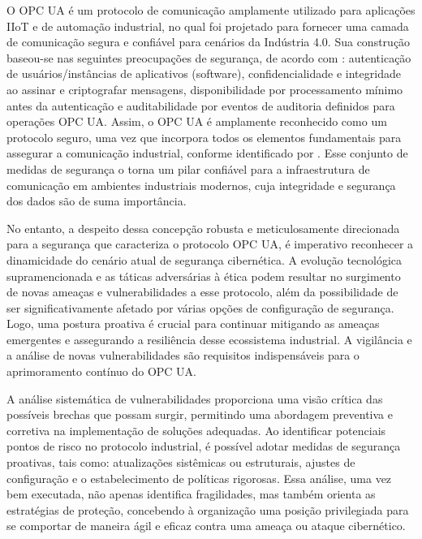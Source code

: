     O OPC UA é um protocolo de comunicação amplamente utilizado para aplicações IIoT e de automação industrial, no qual foi projetado para fornecer uma camada de comunicação segura e confiável para cenários da Indústria 4.0. Sua construção baseou-se nas seguintes preocupações de segurança, de acordo com : autenticação de usuários/instâncias de aplicativos (software), confidencialidade e integridade ao assinar e criptografar mensagens, disponibilidade por processamento mínimo antes da autenticação e auditabilidade por eventos de auditoria definidos para operações OPC UA. Assim, o OPC UA é amplamente reconhecido como um protocolo seguro, uma vez que incorpora todos os elementos fundamentais para assegurar a comunicação industrial, conforme identificado por  . Esse conjunto de medidas de segurança o torna um pilar confiável para a infraestrutura de comunicação em ambientes industriais modernos, cuja integridade e segurança dos dados são de suma importância.

    No entanto, a despeito dessa concepção robusta e meticulosamente direcionada para a segurança que caracteriza o protocolo OPC UA, é imperativo reconhecer a dinamicidade do cenário atual de segurança cibernética. A evolução tecnológica supramencionada e as táticas adversárias à ética podem resultar no surgimento de novas ameaças e vulnerabilidades a esse protocolo, além da possibilidade de ser significativamente afetado por várias opções de configuração de segurança. Logo, uma postura proativa é crucial para continuar mitigando as ameaças emergentes e assegurando a resiliência desse ecossistema industrial. A vigilância e a análise de novas vulnerabilidades são requisitos indispensáveis para o aprimoramento contínuo do OPC UA.

    A análise sistemática de vulnerabilidades proporciona uma visão crítica das possíveis brechas que possam surgir, permitindo uma abordagem preventiva e corretiva na implementação de soluções adequadas. Ao identificar potenciais pontos de risco no protocolo industrial, é possível adotar medidas de segurança proativas, tais como: atualizações sistêmicas ou estruturais, ajustes de configuração e o estabelecimento de políticas rigorosas. Essa análise, uma vez bem executada, não apenas identifica fragilidades, mas também orienta as estratégias de proteção, concebendo à organização uma posição privilegiada para se comportar de maneira ágil e eficaz contra uma ameaça ou ataque cibernético.


